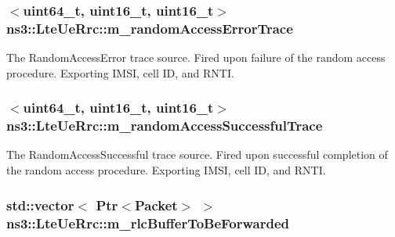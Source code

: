 \subsubsection[{\texorpdfstring{m\+\_\+random\+Access\+Error\+Trace}{m_randomAccessErrorTrace}}]{$<$uint64\+\_\+t, uint16\+\_\+t, uint16\+\_\+t$>$ ns3\+::\+Lte\+Ue\+Rrc\+::m\+\_\+random\+Access\+Error\+Trace\hspace{0.3cm}{\ttfamily [private]}}\hypertarget{classns3_1_1LteUeRrc_a6cde93dc9b01ce7248865b64d7e2e595}{}\label{classns3_1_1LteUeRrc_a6cde93dc9b01ce7248865b64d7e2e595}
The {\ttfamily Random\+Access\+Error} trace source. Fired upon failure of the random access procedure. Exporting I\+M\+SI, cell ID, and R\+N\+TI. 
\subsubsection[{\texorpdfstring{m\+\_\+random\+Access\+Successful\+Trace}{m_randomAccessSuccessfulTrace}}]{$<$uint64\+\_\+t, uint16\+\_\+t, uint16\+\_\+t$>$ ns3\+::\+Lte\+Ue\+Rrc\+::m\+\_\+random\+Access\+Successful\+Trace\hspace{0.3cm}{\ttfamily [private]}}\hypertarget{classns3_1_1LteUeRrc_ad5da54bebd73bd18a6ccbd77b5a87d09}{}\label{classns3_1_1LteUeRrc_ad5da54bebd73bd18a6ccbd77b5a87d09}
The {\ttfamily Random\+Access\+Successful} trace source. Fired upon successful completion of the random access procedure. Exporting I\+M\+SI, cell ID, and R\+N\+TI. 
\subsubsection[{\texorpdfstring{m\+\_\+rlc\+Buffer\+To\+Be\+Forwarded}{m_rlcBufferToBeForwarded}}]{\setlength{\rightskip}{0pt plus 5cm}std\+::vector$<$ {\bf Ptr}$<${\bf Packet}$>$ $>$ ns3\+::\+Lte\+Ue\+Rrc\+::m\+\_\+rlc\+Buffer\+To\+Be\+Forwarded\hspace{0.3cm}{\ttfamily [private]}}\hypertarget{classns3_1_1LteUeRrc_acf565bc650023495082a94923956fb1a}{}\label{classns3_1_1LteUeRrc_acf565bc650023495082a94923956fb1a}
